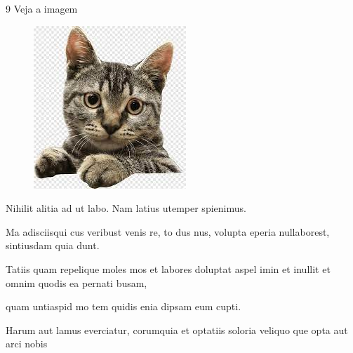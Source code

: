 \num{9} Veja a imagem

\begin{figure}[htpb!]
\includegraphics[width=.5\textwidth]{./cat.jpeg}
\end{figure}

Nihilit alitia ad ut labo. Nam latius utemper spienimus.

\begin{boxlist}
\item Ma adisciisqui cus veribust venis re, to dus nus, volupta eperia nullaborest,
sintiusdam quia dunt.
\item Tatiis quam repelique moles mos et labores doluptat aspel imin et inullit et
omnim quodis ea pernati busam,
\item quam untiaspid mo tem quidis enia dipsam eum cupti.
\item Harum aut lamus everciatur, corumquia et optatiis soloria veliquo que opta
aut arci nobis
\end{boxlist}


